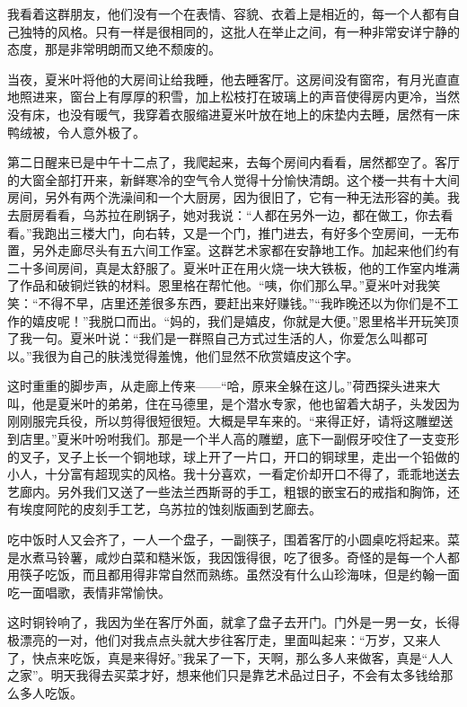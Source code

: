 \par 我看着这群朋友，他们没有一个在表情、容貌、衣着上是相近的，每一个人都有自己独特的风格。只有一样是很相同的，这批人在举止之间，有一种非常安详宁静的态度，那是非常明朗而又绝不颓废的。
\par 当夜，夏米叶将他的大房间让给我睡，他去睡客厅。这房间没有窗帘，有月光直直地照进来，窗台上有厚厚的积雪，加上松枝打在玻璃上的声音使得房内更冷，当然没有床，也没有暖气，我穿着衣服缩进夏米叶放在地上的床垫内去睡，居然有一床鸭绒被，令人意外极了。
\par 第二日醒来已是中午十二点了，我爬起来，去每个房间内看看，居然都空了。客厅的大窗全部打开来，新鲜寒冷的空气令人觉得十分愉快清朗。这个楼一共有十大间房间，另外有两个洗澡间和一个大厨房，因为很旧了，它有一种无法形容的美。我去厨房看看，乌苏拉在刷锅子，她对我说：“人都在另外一边，都在做工，你去看看。”我跑出三楼大门，向右转，又是一个门，推门进去，有好多个空房间，一无布置，另外走廊尽头有五六间工作室。这群艺术家都在安静地工作。加起来他们约有二十多间房间，真是太舒服了。夏米叶正在用火烧一块大铁板，他的工作室内堆满了作品和破铜烂铁的材料。恩里格在帮忙他。“咦，你们那么早。”夏米叶对我笑笑：“不得不早，店里还差很多东西，要赶出来好赚钱。”“我昨晚还以为你们是不工作的嬉皮呢！”我脱口而出。“妈的，我们是嬉皮，你就是大便。”恩里格半开玩笑顶了我一句。夏米叶说：“我们是一群照自己方式过生活的人，你爱怎么叫都可以。”我很为自己的肤浅觉得羞愧，他们显然不欣赏嬉皮这个字。
\par 这时重重的脚步声，从走廊上传来——“哈，原来全躲在这儿。”荷西探头进来大叫，他是夏米叶的弟弟，住在马德里，是个潜水专家，他也留着大胡子，头发因为刚刚服完兵役，所以剪得很短很短。大概是早车来的。“来得正好，请将这雕塑送到店里。”夏米叶吩咐我们。那是一个半人高的雕塑，底下一副假牙咬住了一支变形的叉子，叉子上长一个铜地球，球上开了一片口，开口的铜球里，走出一个铅做的小人，十分富有超现实的风格。我十分喜欢，一看定价却开口不得了，乖乖地送去艺廊内。另外我们又送了一些法兰西斯哥的手工，粗银的嵌宝石的戒指和胸饰，还有埃度阿陀的皮刻手工艺，乌苏拉的蚀刻版画到艺廊去。
\par 吃中饭时人又会齐了，一人一个盘子，一副筷子，围着客厅的小圆桌吃将起来。菜是水煮马铃薯，咸炒白菜和糙米饭，我因饿得很，吃了很多。奇怪的是每一个人都用筷子吃饭，而且都用得非常自然而熟练。虽然没有什么山珍海味，但是约翰一面吃一面唱歌，表情非常愉快。
\par 这时铜铃响了，我因为坐在客厅外面，就拿了盘子去开门。门外是一男一女，长得极漂亮的一对，他们对我点点头就大步往客厅走，里面叫起来：“万岁，又来人了，快点来吃饭，真是来得好。”我呆了一下，天啊，那么多人来做客，真是“人人之家”。明天我得去买菜才好，想来他们只是靠艺术品过日子，不会有太多钱给那么多人吃饭。
